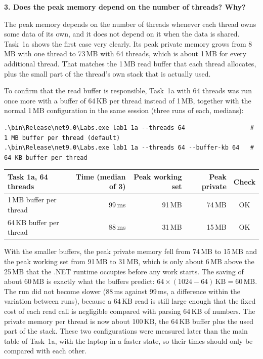 \documentclass[11pt,a4paper]{article}
\newcommand{\question}[1]{\par\medskip\textbf{#1}\par}
\begin{document}
\question{3. Does the peak memory depend on the number of threads? Why?}

The peak memory depends on the number of threads whenever each thread owns some data of its own,
and it does not depend on it when the data is shared. Task~1a shows the first case very clearly.
Its peak private memory grows from 8\,MB with one thread to 73\,MB with 64 threads, which is about
1\,MB for every additional thread. That matches the 1\,MB read buffer that each thread allocates,
plus the small part of the thread's own stack that is actually used.

To confirm that the read buffer is responsible, Task~1a with 64 threads was run once more with a
buffer of 64\,KB per thread instead of 1\,MB, together with the normal 1\,MB configuration in the same
session (three runs of each, medians):

\begin{lstlisting}
.\bin\Release\net9.0\Labs.exe lab1 1a --threads 64                  # 1 MB buffer per thread (default)
.\bin\Release\net9.0\Labs.exe lab1 1a --threads 64 --buffer-kb 64   # 64 KB buffer per thread
\end{lstlisting}

\begin{center}
\small
\begin{tabular}{lrrrc}
\toprule
Task 1a, 64 threads & Time (median of 3) & Peak working set & Peak private & Check \\
\midrule
1\,MB buffer per thread  & 99\,ms & 91\,MB & 74\,MB & OK \\
64\,KB buffer per thread & 88\,ms & 31\,MB & 15\,MB & OK \\
\bottomrule
\end{tabular}
\end{center}

With the smaller buffers, the peak private memory fell from 74\,MB to 15\,MB and the peak working
set from 91\,MB to 31\,MB, which is only about 6\,MB above the 25\,MB that the .NET runtime occupies
before any work starts. The saving of about 60\,MB is exactly what the buffers predict:
$64 \times (1024 - 64)\,\text{KB} = 60\,\text{MB}$. The run did not become slower (88\,ms against
99\,ms, a difference within the variation between runs), because a 64\,KB read is still large enough
that the fixed cost of each read call is negligible compared with parsing 64\,KB of numbers. The
private memory per thread is now about 100\,KB, the 64\,KB buffer plus the used part of the stack.
These two configurations were measured later than the main table of Task~1a, with the laptop in a
faster state, so their times should only be compared with each other.
\end{document}
